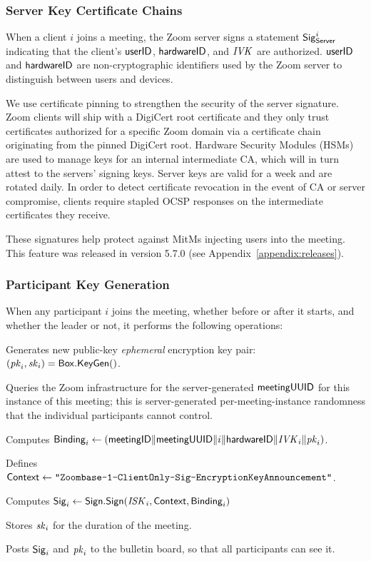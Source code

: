 \subsubsection{Server Key Certificate Chains}
\label{subsubsec:servercert}

When a client $i$ joins a meeting, the Zoom server signs a statement ${\sf Sig}^i_{\mathsf{Server}}$
indicating that the client's $\mathsf{userID}$, ${\sf hardwareID}$, and $\mathit{IVK}$ are authorized. $\mathsf{userID}$ and
${\sf hardwareID}$ are non-cryptographic identifiers used by the Zoom server to distinguish between users
and devices.

We use certificate pinning to strengthen the security of the server signature. Zoom clients will
ship with a DigiCert root certificate and they only trust certificates authorized for a
specific Zoom domain via a certificate chain originating from the pinned DigiCert root. Hardware Security
Modules (HSMs) are used to manage keys for an internal intermediate CA, which will in turn attest to
the servers' signing keys. Server keys are valid for a week and are rotated daily. In order to
detect certificate revocation in the event of CA or server compromise, clients require stapled OCSP
responses on the intermediate certificates they receive.

These signatures help protect against MitMs injecting users into the meeting. This feature was
released in version 5.7.0 (see Appendix~\ref{appendix:releases}).

\subsubsection{Participant Key Generation}
\label{subsubsec:partikeygen}
When any participant $i$ joins the meeting, whether before or after it starts, and whether the
leader or not, it performs the following operations:

\begingroup
\RaggedRight
\begin{enumerate*}
\item Generates new public-key \textit{ephemeral} encryption key pair: $(\mathit{pk}_i, \mathit{sk}_i) =
{\sf Box}.\mathsf{KeyGen}()$.
\item Queries the Zoom infrastructure for the server-generated ${\sf meetingUUID}$ for this instance of
this meeting; this is server-generated per-meeting-instance randomness that the individual
participants cannot control.
\item Computes ${\sf Binding}_i \leftarrow \left( {\sf meetingID} \| \allowbreak {\sf meetingUUID} \| i \allowbreak
\| {\sf hardwareID} \| \mathit{IVK}_i \| \allowbreak \mathit{pk}_i \right)$.
\item Defines ${\sf Context} \leftarrow \texttt{"Zoombase-1-ClientOnly-Sig-EncryptionKeyAnnouncement"}$.
\item Computes ${\sf Sig}_i \leftarrow {\sf Sign}.\mathsf{Sign}(\mathit{ISK}_i, {\sf Context}, {\sf Binding}_i)$
\item Stores $\mathit{sk}_i$ for the duration of the meeting.
\item Posts ${\sf Sig}_i$ and $\mathit{pk}_i$ to the bulletin board, so that all participants can see it.
\end{enumerate*}
\endgroup

